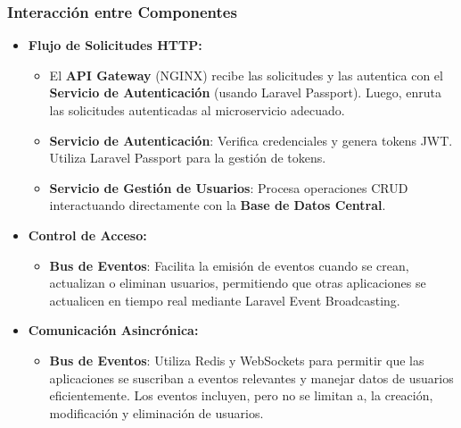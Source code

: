 \subsubsection{Interacción entre Componentes}
\begin{itemize}
    \item \textbf{Flujo de Solicitudes HTTP:}
          \begin{itemize}
              \item El \textbf{API Gateway} (NGINX) recibe las solicitudes y las autentica con el \textbf{Servicio de Autenticación} (usando Laravel Passport). Luego, enruta las solicitudes autenticadas al microservicio adecuado.
              \item \textbf{Servicio de Autenticación}: Verifica credenciales y genera tokens JWT. Utiliza Laravel Passport para la gestión de tokens.
              \item \textbf{Servicio de Gestión de Usuarios}: Procesa operaciones CRUD interactuando directamente con la \textbf{Base de Datos Central}.
          \end{itemize}
    \item \textbf{Control de Acceso:}
          \begin{itemize}
              \item \textbf{Bus de Eventos}: Facilita la emisión de eventos cuando se crean, actualizan o eliminan usuarios, permitiendo que otras aplicaciones se actualicen en tiempo real mediante Laravel Event Broadcasting.
          \end{itemize}
    \item \textbf{Comunicación Asincrónica:}
          \begin{itemize}
              \item \textbf{Bus de Eventos}: Utiliza Redis y WebSockets para permitir que las aplicaciones se suscriban a eventos relevantes y manejar datos de usuarios eficientemente. Los eventos incluyen, pero no se limitan a, la creación, modificación y eliminación de usuarios.
          \end{itemize}
\end{itemize}

